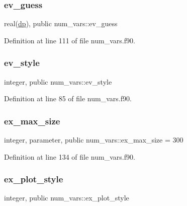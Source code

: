 \subsubsection{\texorpdfstring{ev\+\_\+guess}{ev\_guess}}
{\footnotesize\ttfamily real(\hyperlink{namespacenum__vars_a03802aa2bd86439d7a9370836fabf3f2}{dp}), public num\+\_\+vars\+::ev\+\_\+guess}



Definition at line 111 of file num\+\_\+vars.\+f90.

\mbox{\label{namespacenum__vars_aae749d5063afce3b912a097ff0993d00}} 
\subsubsection{\texorpdfstring{ev\+\_\+style}{ev\_style}}
{\footnotesize\ttfamily integer, public num\+\_\+vars\+::ev\+\_\+style}



Definition at line 85 of file num\+\_\+vars.\+f90.

\mbox{\label{namespacenum__vars_a032fd6a1d45689b56362d8aab1cdc57c}} 
\subsubsection{\texorpdfstring{ex\+\_\+max\+\_\+size}{ex\_max\_size}}
{\footnotesize\ttfamily integer, parameter, public num\+\_\+vars\+::ex\+\_\+max\+\_\+size = 300}



Definition at line 134 of file num\+\_\+vars.\+f90.

\mbox{\label{namespacenum__vars_aac52d1fda60883bea62738fe0ecd7527}} 
\subsubsection{\texorpdfstring{ex\+\_\+plot\+\_\+style}{ex\_plot\_style}}
{\footnotesize\ttfamily integer, public num\+\_\+vars\+::ex\+\_\+plot\+\_\+style}



